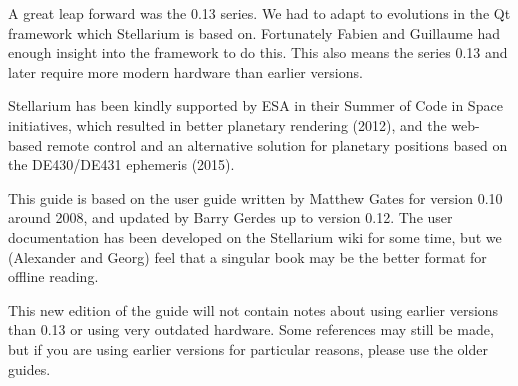 

A great leap forward was the 0.13 series. We had to adapt to
evolutions in the Qt framework which Stellarium is based
on. Fortunately Fabien and Guillaume had enough insight into the
framework to do this. This also means the series 0.13 and later
require more modern hardware than earlier versions.

Stellarium has been kindly supported by ESA in their Summer of Code in
Space initiatives, which resulted in better planetary rendering
(2012), and the web-based remote control and an alternative solution
for planetary positions based on the DE430/DE431 ephemeris (2015).


This guide is based on the user guide written by Matthew Gates for
version 0.10 around 2008, and updated by Barry Gerdes up to version
0.12. %
The user documentation has been developed on the Stellarium wiki for
some time, but we (Alexander and Georg) feel that a singular book may
be the better format for offline reading.

This new edition of the guide will not contain notes about using
earlier versions than 0.13 or using very outdated hardware. Some
references may still be made, but if you are using earlier versions
for particular reasons, please use the older guides.

